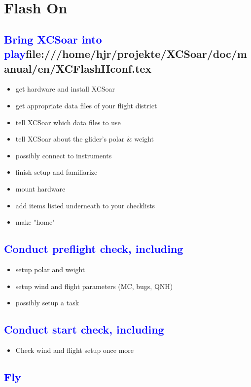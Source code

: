 \section*{Flash {\color[rgb]{.9,.85,0}On}}\label{ch:flashon}

\subsection{\textcolor{blue}{Bring XCSoar into play}file:///home/hjr/projekte/XCSoar/doc/manual/en/XCFlashIIconf.tex
}
\begin{itemize}
\item get hardware and install XCSoar
\item get appropriate data files of your flight district
\item tell XCSoar which data files to use
\item tell XCSoar about the glider's polar \& weight
\item possibly connect to instruments
\item finish setup and familiarize
\item mount hardware
\item add items listed underneath to your checklists
\item make "home"
\end{itemize}

\subsection{\textcolor{blue}{Conduct preflight check, including}}
\begin{itemize}
\item setup polar and weight
\item setup wind and flight parameters (MC, bugs, QNH)
\item possibly setup a task
\end{itemize}

\subsection{\textcolor{blue}{Conduct start check, including}}
\begin{itemize}
\item Check wind and flight setup once more
\end{itemize}

\subsection{\textcolor{blue}{Fly}}
\vspace{1em}

